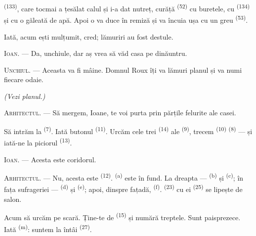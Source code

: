 \textsuperscript{(133)}, care tocmai a țesălat calul
și i-a dat nutreț, curăță  \textsuperscript{(52)} cu buretele, cu
 \textsuperscript{(134)} și cu o găleată de apă. Apoi o va
duce în remiză și va încuia ușa cu un  greu \textsuperscript{(53)}.

Iată, acum ești mulțumit, cred; lămuriri au fost destule.

\textsc{Ioan}. --- Da, unchiule, dar aș vrea să văd casa pe dinăuntru.

\textsc{Unchiul}. --- Aceasta va fi mâine. Domnul Roux îți va lămuri planul și va
numi fiecare odaie.

\VUsaut{3.0mm}
\VUsaut{2.4mm}

{\centering\textit{(Vezi planul.)}\par}
\VUsaut{2.4mm}

\textsc{Arhitectul}. --- Să mergem, Ioane, te voi purta prin părțile felurite ale
casei.

Să intrăm la  \textsuperscript{(7)}. Iată butonul
 \textsuperscript{(11)}. Urcăm cele trei 
\textsuperscript{(14)} ale  \textsuperscript{(9)}, trecem
 \textsuperscript{(10)} 
\textsuperscript{(8)} --- și iată-ne la piciorul 
\textsuperscript{(13)}.

\textsc{Ioan}. --- Acesta este coridorul.

\textsc{Arhitectul}. --- Nu, acesta este 
\textsuperscript{(12)}.  \textsuperscript{(a)} este în fund. La
dreapta ---  \textsuperscript{(b)} și 
\textsuperscript{(c)}; în fața sufrageriei --- 
\textsuperscript{(d)} și  \textsuperscript{(e)}; apoi, dinspre
fațadă,  \textsuperscript{(f)}. 
\textsuperscript{(23)} cu  ei 
\textsuperscript{(25)} se lipește de salon.

Acum să urcăm pe scară. Ține-te de  \textsuperscript{(15)} și
numără treptele. Sunt paisprezece. Iată 
\textsuperscript{(m)}: suntem la  întâi \textsuperscript{(27)}.

\VUsaut{3.0mm}
\VUsaut{3.0mm}

